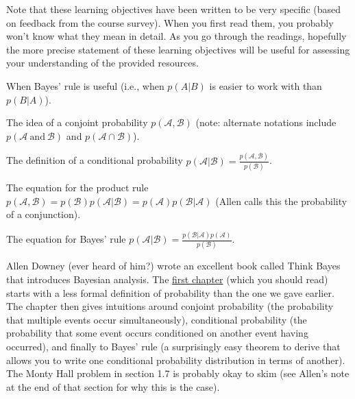 \documentclass[assignment01_Solutions]{subfiles}
\begin{document}
\begin{externalresources}[(60 minutes)]
\begin{learningobjectives}
Note that these learning objectives have been written to be very specific (based on feedback from the course survey).  When you first read them, you probably won't know what they mean in detail.  As you go through the readings, hopefully the more precise statement of these learning objectives will be useful for assessing your understanding of the provided resources.

\bi
\item When Bayes' rule is useful (i.e., when $p(A|B)$ is easier to work with than $p(B|A)$).
\item The idea of a conjoint probability $p(\mathcal{A}, \mathcal{B})$ (note: alternate notations include $p(\mathcal{A}~\mbox{and}~\mathcal{B})$ and $p(\mathcal{A} \cap \mathcal{B})$).
\item The definition of a conditional probability $p(\mathcal{A} | \mathcal{B}) = \frac{p(\mathcal{A},\mathcal{B})}{p(\mathcal{B})}$.
\item The equation for the product rule $p(\mathcal{A}, \mathcal{B}) = p(\mathcal{B}) p(\mathcal{A} | \mathcal{B}) =  p(\mathcal{A}) p(\mathcal{B} | \mathcal{A})$ (Allen calls this the probability of a conjunction).
\item The equation for Bayes' rule $p(\mathcal{A} | \mathcal{B}) = \frac{p(\mathcal{B} | \mathcal{A}) p(\mathcal{A})}{p(\mathcal{B})}$.
\ei
\end{learningobjectives}

Allen Downey (ever heard of him?) wrote an excellent book called Think Bayes that introduces Bayesian analysis.  The \href{http://www.greenteapress.com/thinkbayes/html/thinkbayes002.html}{first chapter} (which you should read) starts with a less formal definition of probability than the one we gave earlier.  The chapter then gives intuitions around conjoint probability (the probability that multiple events occur simultaneously), conditional probability (the probability that some event occurs conditioned on another event having occurred), and finally to Bayes' rule (a surprisingly easy theorem to derive that allows you to write one conditional probability distribution in terms of another).  The Monty Hall problem in section 1.7 is probably okay to skim (see Allen's note at the end of that section for why this is the case).


\end{externalresources}
\end{document}
